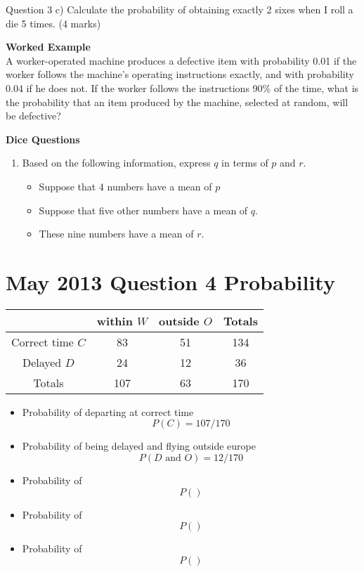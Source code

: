 


Question 3
c) Calculate the probability of obtaining exactly 2 sixes when I roll a die 5 times.
(4 marks)

\noindent \textbf{Worked Example}\\
A worker-operated machine produces a defective item with probability 0.01 if the worker follows the machine’s operating instructions exactly, and with probability 0.04 if he does not. If the worker follows the instructions 90\% of the time, what is the probability that an item produced by the machine, selected at random, will be defective?







\textbf{Dice Questions}
\begin{enumerate}

\item Based on the following information, express $q$ in terms of $p$ and $r$.
\begin{itemize}
\item Suppose that 4 numbers have a mean of $p$
\item Suppose that five other numbers have a mean of $q$.
\item These nine numbers have a mean of $r$.
\end{itemize}


\end{enumerate}

\section*{May 2013 Question 4 Probability}
\begin{center}
\begin{tabular}{|c|c|c|c|}
\hline  & within $W$ & outside $O$ & Totals \\ 
\hline Correct time $C$ & 83 & 51 & 134 \\ 
\hline Delayed $D$ & 24 & 12 & 36 \\ 
\hline Totals & 107 & 63 & 170 \\ 
\hline 
\end{tabular} 
\end{center}\begin{itemize}
\item Probability of departing at correct time
\[P(C) = 107/170\]
\item Probability of being delayed and flying outside europe 
\[P(D  \mbox{ and } O) = 12/170\]
\item Probability of 
\[P() \]
\item Probability of 
\[P() \]
\item Probability of 
\[P() \]
\end{itemize}
